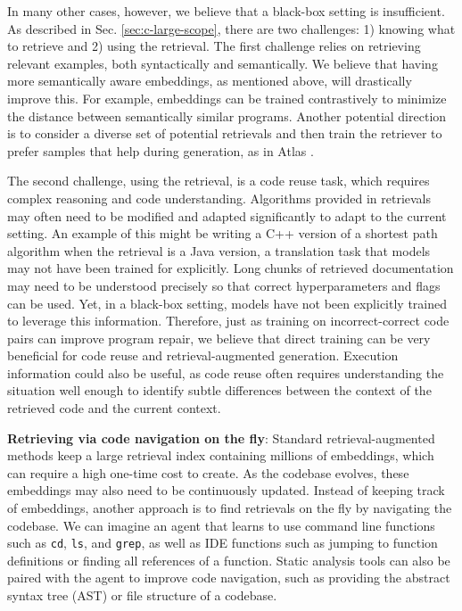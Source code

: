In many other cases, however, we believe that a black-box setting is insufficient. As described in Sec. \ref{sec:c-large-scope}, there are two challenges: 1) knowing what to retrieve and 2) using the retrieval. The first challenge relies on retrieving relevant examples, both syntactically and semantically. We believe that having more semantically aware embeddings, as mentioned above, will drastically improve this. For example, embeddings can be trained contrastively to minimize the distance between semantically similar programs. Another potential direction is to consider a diverse set of potential retrievals and then train the retriever to prefer samples that help during generation, as in Atlas \citep{izacard2023atlas}.

The second challenge, using the retrieval, is a code reuse task, which requires complex reasoning and code understanding. Algorithms provided in retrievals may often need to be modified and adapted significantly to adapt to the current setting. An example of this might be writing a C++ version of a shortest path algorithm
when the retrieval is a Java version, a translation task that models may not have been trained for explicitly. Long chunks of retrieved documentation may need to be understood precisely so that correct hyperparameters and flags can be used. Yet, in a black-box setting, models have not been explicitly trained to leverage this information. Therefore, just as training on incorrect-correct code pairs can improve program repair, we believe that direct training can be very beneficial for code reuse and retrieval-augmented generation. Execution information could also be useful, as code reuse often requires understanding the situation well enough to identify subtle differences between the context of the retrieved code and the current context. 

\textbf{Retrieving via code navigation on the fly}: Standard retrieval-augmented methods keep a large retrieval index containing millions of embeddings, which can require a high one-time cost to create. As the codebase evolves, these embeddings may also need to be continuously updated. Instead of keeping track of embeddings, another approach is to find retrievals on the fly by navigating the codebase. We can imagine an agent that learns to use command line functions such as \texttt{cd}, \texttt{ls}, and \texttt{grep}, as well as IDE functions such as jumping to function definitions or finding all references of a function. Static analysis tools can also be paired with the agent to improve code navigation, such as providing the abstract syntax tree (AST) or file structure of a codebase.





